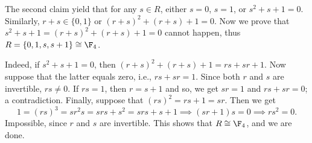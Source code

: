 The second claim yield that for any $s \in R$, either $s = 0$, $s = 1$, or $s^2 + s + 1 = 0$.
Similarly, $r + s \in \{0, 1\}$ or $(r + s)^2 + (r + s) + 1 = 0$.
Now we prove that $s^2 + s + 1 = (r + s)^2 + (r + s) + 1 = 0$ cannot happen, thus $R = \{0, 1, s, s + 1\} \cong \F_4$.

Indeed, if $s^2 + s + 1 = 0$, then $(r + s)^2 + (r + s) + 1 = rs + sr + 1$.
Now suppose that the latter equals zero, i.e., $rs + sr = 1$.
Since both $r$ and $s$ are invertible, $rs \neq 0$.
If $rs = 1$, then $r = s + 1$ and so, we get $sr = 1$ and $rs + sr = 0$; a contradiction.
Finally, suppose that $(rs)^2 = rs + 1 = sr$.
Then we get
\[ 1 = (rs)^3 = sr^2 s = srs + s^2 = srs + s + 1 \implies (sr + 1) s = 0 \implies rs^2 = 0. \]
Impossible, since $r$ and $s$ are invertible.
This shows that $R \cong \F_4$, and we are done.

